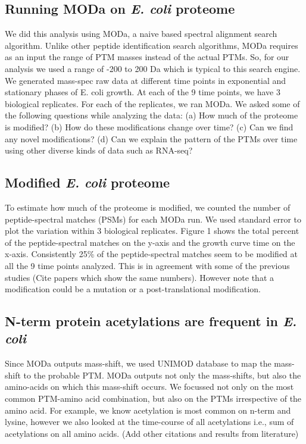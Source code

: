 \documentclass[12pt]{article}
\begin{document}
\subsection{Running MODa on \emph{E. coli} proteome}
We did this analysis using MODa, a naive based spectral alignment search algorithm. Unlike other peptide identification search algorithms, MODa requires as an input the range of PTM masses instead of the actual PTMs. So, for our analysis we used a range of -200 to 200 Da which is typical to this search engine. We generated mass-spec raw data at different time points in exponential and stationary phases of E. coli growth.
At each of the 9 time points, we have 3 biological replicates. For each of the replicates, we ran MODa. We asked some of the following questions while analyzing the data:
(a) How much of the proteome is modified? (b) How do these modifications change over time? (c) Can we find any novel modifications? (d) Can we explain the pattern of the PTMs over time using other diverse kinds of data such as RNA-seq?

\subsection{Modified \emph{E. coli} proteome}
To estimate how much of the proteome is modified, we counted the number of peptide-spectral matches (PSMs) for each MODa run. We used standard error to plot the variation within 3 biological replicates.
Figure 1 shows the total percent of the peptide-spectral matches on the y-axis and the growth curve time on the x-axis. Consistently 25\% of the peptide-spectral matches seem to be modified at all the 9 time points analyzed.
This is in agreement with some of the previous studies (Cite papers which show the same numbers). However note that a modification could be a mutation or a post-translational modification.

\subsection{N-term protein acetylations are frequent in \emph{E. coli}}
Since MODa outputs mass-shift, we used UNIMOD database to map the mass-shift to the probable PTM. MODa outputs not only the mass-shifts, but also the amino-acids on which this mass-shift occurs. We focussed not only on the most common PTM-amino acid combination, but also on the PTMs irrespective of the amino acid. For example, we know acetylation is most common on n-term and lysine, however we also looked at the time-course of all acetylations i.e., sum of acetylations on all amino acids. (Add other citations and results from literature)
\end{document}
